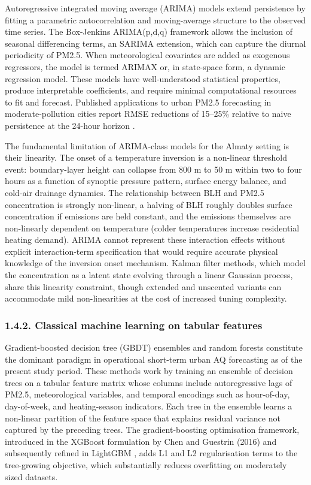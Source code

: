 Autoregressive integrated moving average (ARIMA) models extend persistence by fitting a parametric autocorrelation and moving-average structure to the observed time series. The Box-Jenkins ARIMA(p,d,q) framework allows the inclusion of seasonal differencing terms, an SARIMA extension, which can capture the diurnal periodicity of PM2.5. When meteorological covariates are added as exogenous regressors, the model is termed ARIMAX or, in state-space form, a dynamic regression model. These models have well-understood statistical properties, produce interpretable coefficients, and require minimal computational resources to fit and forecast. Published applications to urban PM2.5 forecasting in moderate-pollution cities report RMSE reductions of 15--25\% relative to naive persistence at the 24-hour horizon \cite{mahajan2018shortterm}.

The fundamental limitation of ARIMA-class models for the Almaty setting is their linearity. The onset of a temperature inversion is a non-linear threshold event: boundary-layer height can collapse from 800 m to 50 m within two to four hours as a function of synoptic pressure pattern, surface energy balance, and cold-air drainage dynamics. The relationship between BLH and PM2.5 concentration is strongly non-linear, a halving of BLH roughly doubles surface concentration if emissions are held constant, and the emissions themselves are non-linearly dependent on temperature (colder temperatures increase residential heating demand). ARIMA cannot represent these interaction effects without explicit interaction-term specification that would require accurate physical knowledge of the inversion onset mechanism. Kalman filter methods, which model the concentration as a latent state evolving through a linear Gaussian process, share this linearity constraint, though extended and unscented variants can accommodate mild non-linearities at the cost of increased tuning complexity.

\subsubsection{1.4.2. Classical machine learning on tabular features}\label{classical-machine-learning-on-tabular-features}

Gradient-boosted decision tree (GBDT) ensembles and random forests constitute the dominant paradigm in operational short-term urban AQ forecasting as of the present study period. These methods work by training an ensemble of decision trees on a tabular feature matrix whose columns include autoregressive lags of PM2.5, meteorological variables, and temporal encodings such as hour-of-day, day-of-week, and heating-season indicators. Each tree in the ensemble learns a non-linear partition of the feature space that explains residual variance not captured by the preceding trees. The gradient-boosting optimisation framework, introduced in the XGBoost formulation by Chen and Guestrin (2016) \cite{chen2016xgboost} and subsequently refined in LightGBM \cite{ke2017lightgbm}, adds L1 and L2 regularisation terms to the tree-growing objective, which substantially reduces overfitting on moderately sized datasets.

